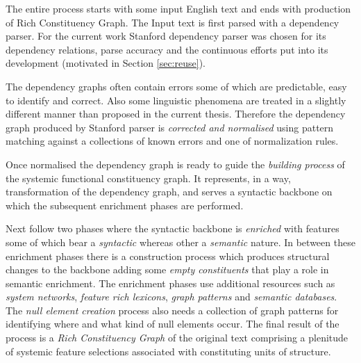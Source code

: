 The entire process starts with some input English text and ends with production of Rich Constituency Graph. The Input text is first parsed with a dependency parser. For the current work Stanford dependency parser was chosen for its dependency relations, parse accuracy and the continuous efforts put into its development (motivated in Section \ref{sec:reuse}). 

The dependency graphs often contain errors some of which are predictable, easy to identify and correct. Also some linguistic phenomena are treated in a slightly different manner than proposed in the current thesis. Therefore the dependency graph produced by Stanford parser is \textit{corrected and normalised} using pattern matching against a collections of known errors and one of normalization rules.

Once normalised the dependency graph is ready to guide the \textit{building process} of the systemic functional constituency graph. It represents, in a way, transformation of the dependency graph, and serves a syntactic backbone on which the subsequent enrichment phases are performed.

Next follow two phases where the syntactic backbone is \textit{enriched} with features some of which bear a \textit{syntactic} whereas other a \textit{semantic} nature. In between these enrichment phases there is a construction process which produces structural changes to the backbone adding some \textit{empty constituents} that play a role in semantic enrichment. The enrichment phases use additional resources such as \textit{system networks}, \textit{feature rich lexicons}, \textit{graph patterns} and \textit{semantic databases}. The \textit{null element creation} process also needs a collection of graph patterns for identifying where and what kind of null elements occur. The final result of the process is a \textit{Rich Constituency Graph} of the original text comprising a plenitude of systemic feature selections associated with constituting units of structure. 

